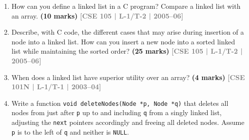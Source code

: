 \documentclass[12pt,a3paper]{article}
\newcommand{\yr}[1]{\hfill\textcolor{gray}{\small\textbf{[#1]}}}
\newcommand{\mk}[1]{\textcolor{orange!70!black}{\small\textbf{(#1 marks)}}}
\begin{document}
\begin{enumerate}
\item How can you define a linked list in a C program? Compare a linked list with an array.
\mk{10} \yr{CSE 105 | L-1/T-2 | 2005--06}

\item Describe, with C code, the different cases that may arise during insertion of a node into a linked list. How can you insert a new node into a sorted linked list while maintaining the sorted order?
\mk{25} \yr{CSE 105 | L-1/T-2 | 2005--06}

\item When does a linked list have superior utility over an array?
\mk{4} \yr{CSE 101N | L-1/T-1 | 2003--04}

\item Write a function \texttt{void deleteNodes(Node *p, Node *q)} that deletes all nodes from just after \texttt{p} up to and including \texttt{q} from a singly linked list, adjusting the \texttt{next} pointers accordingly and freeing all deleted nodes. Assume \texttt{p} is to the left of \texttt{q} and neither is \texttt{NULL}.

\begin{center}
\end{center}
\end{enumerate}
\end{document}
